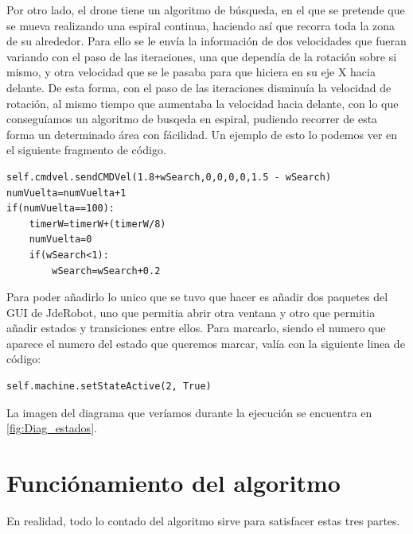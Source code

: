 \hspace{1cm} Por otro lado, el drone tiene un algoritmo de b\'usqueda, en el que se pretende que se mueva realizando una espiral continua, haciendo as\'i que recorra toda la zona de su alrededor. Para ello se le env\'ia la informaci\'on de dos velocidades que fueran variando con el paso de las iteraciones, una que depend\'ia de la rotaci\'on sobre si mismo, y otra velocidad que se le pasaba para que hiciera en su eje X hacia delante. De esta forma, con el paso de las iteraciones disminu\'ia la velocidad de rotaci\'on, al mismo tiempo que aumentaba la velocidad hacia delante, con lo que consegu\'iamos un algoritmo de busqeda en espiral, pudiendo recorrer de esta forma un determinado \'area con f\'acilidad. Un ejemplo de esto lo podemos ver en el siguiente fragmento de c\'odigo.

\begin{verbatim}
self.cmdvel.sendCMDVel(1.8+wSearch,0,0,0,0,1.5 - wSearch)
numVuelta=numVuelta+1
if(numVuelta==100):
    timerW=timerW+(timerW/8)
    numVuelta=0
    if(wSearch<1):
        wSearch=wSearch+0.2
\end{verbatim}

\hspace{1cm}	

\hspace{1cm} Para poder añadirlo lo unico que se tuvo que hacer es añadir dos paquetes del GUI de JdeRobot, uno que permitia abrir otra ventana y otro que permitia añadir estados y transiciones entre ellos. Para marcarlo, siendo el numero que aparece el numero del estado que queremos marcar, val\'ia con la siguiente linea de c\'odigo:

\begin{verbatim}
self.machine.setStateActive(2, True)
\end{verbatim}
	
\hspace{1cm}La imagen del diagrama que ver\'iamos durante la ejecuci\'on se encuentra en \ref{fig:Diag_estados}.


\section{Funci\'onamiento del algoritmo}
\hspace{1cm} En realidad, todo lo contado del algoritmo sirve para satisfacer estas tres partes. 

